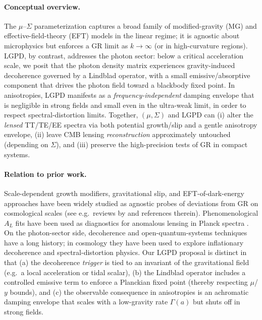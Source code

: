 \paragraph{Conceptual overview.}
The $\mu$--$\Sigma$ parameterization captures a broad family of modified-gravity (MG) and effective-field-theory (EFT) models in the linear regime; it is agnostic about microphysics but enforces a GR limit as $k\!\to\!\infty$ (or in high-curvature regions). LGPD, by contrast, addresses the photon sector: below a critical acceleration scale, we posit that the photon density matrix experiences gravity-induced decoherence governed by a Lindblad operator, with a small emissive/absorptive component that drives the photon field toward a blackbody fixed point. In anisotropies, LGPD manifests as a \emph{frequency-independent} damping envelope that is negligible in strong fields and small even in the ultra-weak limit, in order to respect spectral-distortion limits. Together, $(\mu,\Sigma)$ and LGPD can (i) alter the \emph{lensed} TT/TE/EE spectra via both potential growth/slip and a gentle anisotropy envelope, (ii) leave CMB lensing \emph{reconstruction} approximately untouched (depending on $\Sigma$), and (iii) preserve the high-precision tests of GR in compact systems.

\paragraph{Relation to prior work.}
Scale-dependent growth modifiers, gravitational slip, and EFT-of-dark-energy approaches have been widely studied as agnostic probes of deviations from GR on cosmological scales (see e.g.\ reviews by \cite{Clifton2012_review,Joyce2016_review} and references therein). Phenomenological $A_L$ fits have been used as diagnostics for anomalous lensing in Planck spectra \cite{Planck2018_lensing}. On the photon-sector side, decoherence and open-quantum-systems techniques have a long history; in cosmology they have been used to explore inflationary decoherence and spectral-distortion physics. Our LGPD proposal is distinct in that (a) the decoherence \emph{trigger} is tied to an invariant of the gravitational field (e.g.\ a local acceleration or tidal scalar), (b) the Lindblad operator includes a controlled emissive term to enforce a Planckian fixed point (thereby respecting $\mu$/$y$ bounds), and (c) the observable consequence in anisotropies is an achromatic damping envelope that scales with a low-gravity rate $\Gamma(a)$ but shuts off in strong fields.


